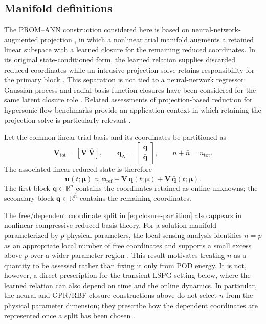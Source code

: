 \documentclass[11pt]{article}
\begin{document}
\subsection{Manifold definitions}
The PROM--ANN construction considered here is based on neural-network-augmented
projection \cite{barnett2023neural}, in which a nonlinear trial manifold
augments a retained linear subspace with a learned closure for the remaining
reduced coordinates.  In its original state-conditioned form, the learned
relation supplies discarded reduced coordinates while an intrusive projection
solve retains responsibility for the primary block \cite{barnett2023neural}.
This separation is not tied to a neural-network regressor: Gaussian-process
and radial-basis-function closures have been considered for the same latent
closure role \cite{ares2026closure}.  Related assessments of
projection-based reduction for hypersonic-flow benchmarks provide an
application context in which retaining the projection solve is particularly
relevant \cite{chmiel2024assessment,chmiel2025unified}.

Let the common linear trial basis and its
coordinates be partitioned as
\begin{equation}
\mathbf V_{\mathrm{tot}}=[\mathbf V\ \overline{\mathbf V}],
\qquad
\mathbf q_N=
\begin{bmatrix}
\mathbf q\\
\bar{\mathbf q}
\end{bmatrix},
\qquad
n+\bar n=n_{\mathrm{tot}}.
\label{eq:closure-partition}
\end{equation}
The associated linear reduced state is therefore
\begin{equation}
\mathbf u(t;\bm\mu)
\approx
\mathbf u_{\mathrm{ref}}
+\mathbf V\,\mathbf q(t;\bm\mu)
+\overline{\mathbf V}\,\bar{\mathbf q}(t;\bm\mu).
\label{eq:linear-partitioned-state}
\end{equation}
The first block $\mathbf q\in\mathbb R^n$ contains the coordinates retained
as online unknowns; the secondary block
$\bar{\mathbf q}\in\mathbb R^{\bar n}$ contains the remaining coordinates.

The free/dependent coordinate split in \eqref{eq:closure-partition} also
appears in nonlinear compressive reduced-basis theory.  For a solution
manifold parameterized by $p$ physical parameters, the local sensing analysis
identifies $n=p$ as an appropriate local number of free coordinates and
supports a small excess above $p$ over a wider parameter region
\cite{aghili2026nonlinear}.  This result motivates
treating $n$ as a quantity to be assessed rather than fixing it only from POD
energy.  It is not, however, a direct prescription for the transient LSPG
setting below, where the learned relation can also depend on time and the
online dynamics.  In particular, the neural and GPR/RBF closure
constructions above do not select $n$ from the physical parameter dimension;
they prescribe how the dependent coordinates are represented once a split has
been chosen \cite{barnett2023neural,ares2026closure}.
\end{document}
